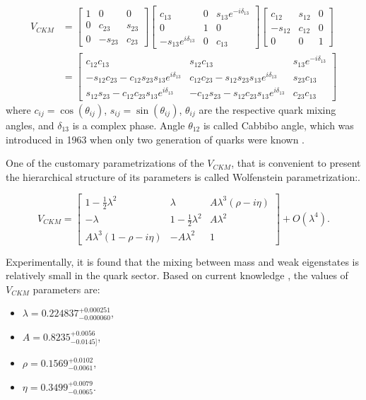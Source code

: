 \begin{align} V_{CKM}  &= \begin{bmatrix} 1 & 0 & 0 \\ 0 & c_{23} & s_{23} \\ 0 & -s_{23} & c_{23} \end{bmatrix}
 \begin{bmatrix} c_{13} & 0 & s_{13}e^{-i\delta_{13}} \\ 0 & 1 & 0 \\ -s_{13}e^{i\delta_{13}} & 0 & c_{13} \end{bmatrix}
 \begin{bmatrix} c_{12} & s_{12} & 0 \\ -s_{12} & c_{12} & 0 \\ 0 & 0 & 1 \end{bmatrix} \nonumber \\ 
 & = \begin{bmatrix} c_{12}c_{13} & s_{12} c_{13} & s_{13}e^{-i\delta_{13}} \\
 -s_{12}c_{23} - c_{12}s_{23}s_{13}e^{i\delta_{13}} & c_{12}c_{23} - s_{12}s_{23}s_{13}e^{i\delta_{13}} & s_{23}c_{13}\\
 s_{12}s_{23} - c_{12}c_{23}s_{13}e^{i\delta_{13}} & -c_{12}s_{23} - s_{12}c_{23}s_{13}e^{i\delta_{13}} & c_{23}c_{13} \end{bmatrix}
\end{align}
where $c_{ij} =\cos(\theta_{ij})$, $s_{ij} =\sin(\theta_{ij})$,  $\theta_{ij}$ are the respective quark mixing angles, and $\delta_{13}$ is a complex phase. Angle $\theta_{12}$ is called Cabbibo angle, which was introduced in 1963 when only two generation of quarks were known \cite{cabibbo}. 


One of the customary parametrizations of the $V_{CKM}$, that is convenient to present the hierarchical structure of its parameters is called Wolfenstein \cite{wolfenstein} parametrization:.

\begin{equation}
\label{eq:wolfenstein}
   V_{CKM} =  \begin{bmatrix} 1-\tfrac{1}{2}\lambda^2 & \lambda & A\lambda^3(\rho-i\eta) \\
 -\lambda & 1-\tfrac{1}{2}\lambda^2 & A\lambda^2 \\
 A\lambda^3(1-\rho-i\eta) & -A\lambda^2 & 1  \end{bmatrix} + O(\lambda^4).
\end{equation}

Experimentally, it is found that the mixing between mass and weak eigenstates is relatively small in the quark sector. Based on current knowledge \cite{CKMFitter}, the values of $V_{CKM}$ parameters are:
\begin{itemize}
\item $\lambda=0.224837^{+0.000251}_{-0.000060}$,
 \item  $A= 0.8235^{+0.0056}_{-0.0145]}$, 
 \item  $\rho=0.1569^{+0.0102}_{-0.0061}$,
 \item  $\eta=0.3499^{+0.0079}_{-0.0065}$.
\end{itemize}

